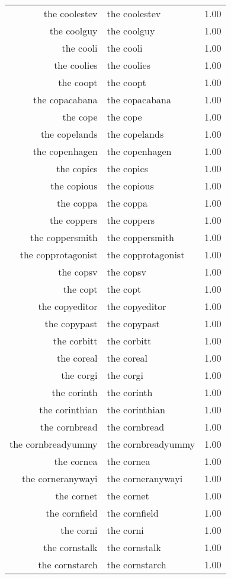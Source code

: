 \begin{table}[ht]
\begin{tabular}{rlr}
  the coolestev & the coolestev & 1.00 \\ 
  the coolguy & the coolguy & 1.00 \\ 
  the cooli & the cooli & 1.00 \\ 
  the coolies & the coolies & 1.00 \\ 
  the coopt & the coopt & 1.00 \\ 
  the copacabana & the copacabana & 1.00 \\ 
  the cope & the cope & 1.00 \\ 
  the copelands & the copelands & 1.00 \\ 
  the copenhagen & the copenhagen & 1.00 \\ 
  the copics & the copics & 1.00 \\ 
  the copious & the copious & 1.00 \\ 
  the coppa & the coppa & 1.00 \\ 
  the coppers & the coppers & 1.00 \\ 
  the coppersmith & the coppersmith & 1.00 \\ 
  the copprotagonist & the copprotagonist & 1.00 \\ 
  the copsv & the copsv & 1.00 \\ 
  the copt & the copt & 1.00 \\ 
  the copyeditor & the copyeditor & 1.00 \\ 
  the copypast & the copypast & 1.00 \\ 
  the corbitt & the corbitt & 1.00 \\ 
  the coreal & the coreal & 1.00 \\ 
  the corgi & the corgi & 1.00 \\ 
  the corinth & the corinth & 1.00 \\ 
  the corinthian & the corinthian & 1.00 \\ 
  the cornbread & the cornbread & 1.00 \\ 
  the cornbreadyummy & the cornbreadyummy & 1.00 \\ 
  the cornea & the cornea & 1.00 \\ 
  the corneranywayi & the corneranywayi & 1.00 \\ 
  the cornet & the cornet & 1.00 \\ 
  the cornfield & the cornfield & 1.00 \\ 
  the corni & the corni & 1.00 \\ 
  the cornstalk & the cornstalk & 1.00 \\ 
  the cornstarch & the cornstarch & 1.00 \\ 

\end{tabular}
\end{table}
